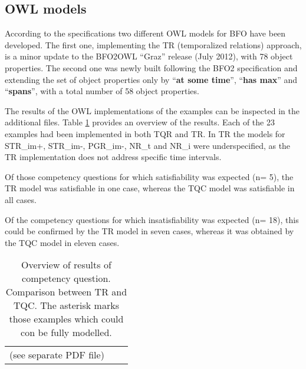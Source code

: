 \subsection*{OWL models}



According to the specifications two different OWL models for BFO have been developed. 
The first one, implementing the TR (temporalized relations) approach, is a minor update to the BFO2OWL ``Graz'' release 
(July 2012), with 78 object properties. 
The second one was newly built following the BFO2 specification and extending the set of object properties 
only by ``\textbf{at some time}'', ``\textbf{has max}'' and ``\textbf{spans}'', with a total number of 58 object properties. 

The results of the OWL implementations of the examples can be inspected in the additional files. 
Table \ref{tab:results} provides an overview of the results. Each of the 23 examples had been implemented in both TQR and TR. In TR
the models for STR\_im+, STR\_im-, PGR\_im-, NR\_t and NR\_i were underspecified, 
as the TR implementation does not address specific time intervals. 



Of those competency questions for which satisfiability was expected (n= 5), the TR model 
was satisfiable in one case, whereas the TQC model was satisfiable in all cases.  



Of the competency questions for which insatisfiability was expected (n= 18), 
this could be confirmed by the TR model in seven cases, whereas it was obtained by the TQC model in eleven cases. 

\begin{table}
\caption{Overview of results of competency question. Comparison between TR and TQC.  The asterisk 
marks those examples which could con be fully modelled.}
\label{tab:results}
{
\begin{tabular}{p{10.9em}cp{10.5em}}
\parskip=0cm
\parbox{10.9em}{(see separate PDF file)} \\
\end{tabular}
}
\end{table}






